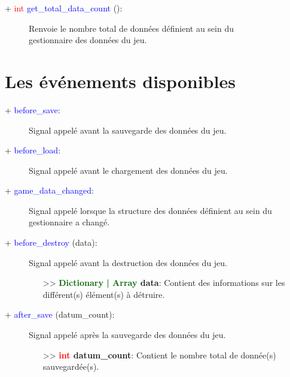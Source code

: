 \documentclass[a4paper, 11pt]{article}
\begin{document}
	\begin{description}
		\item [+ \textcolor{red}{int} \textcolor{blue}{get\_total\_data\_count} ():] Renvoie le nombre total
		de données définient au sein du \\gestionnaire des données du jeu.
	\end{description}

	\newpage \section{Les événements disponibles}
	\begin{description}
		\item [+ \textcolor{blue}{before\_save}:] Signal appelé avant la sauvegarde des données du jeu.
	\end{description}
	\begin{description}
		\item [+ \textcolor{blue}{before\_load}:] Signal appelé avant le chargement des données du jeu.
	\end{description}
	\begin{description}
		\item [+ \textcolor{blue}{game\_data\_changed}:] Signal appelé lorsque la structure des données
		définient au sein du \\gestionnaire a changé.\\
	\end{description}
	\begin{description}
		\item [+ \textcolor{blue}{before\_destroy} (data):] Signal appelé avant la destruction des données 
		du jeu.
		\begin{itemize}
			\item [>> \textbf{\textcolor{darkgreen}{Dictionary | Array} data}:] Contient des informations
			sur les différent(s) élément(s) à détruire.\\
		\end{itemize}
	\end{description}
	\begin{description}
		\item [+ \textcolor{blue}{after\_save} (datum\_count):] Signal appelé après la sauvegarde des
		données du jeu.
		\begin{itemize}
			\item [>> \textbf{\textcolor{red}{int} datum\_count}:] Contient le nombre total de donnée(s)
			sauvegardée(s).\\
		\end{itemize}
	\end{description}
\end{document}
